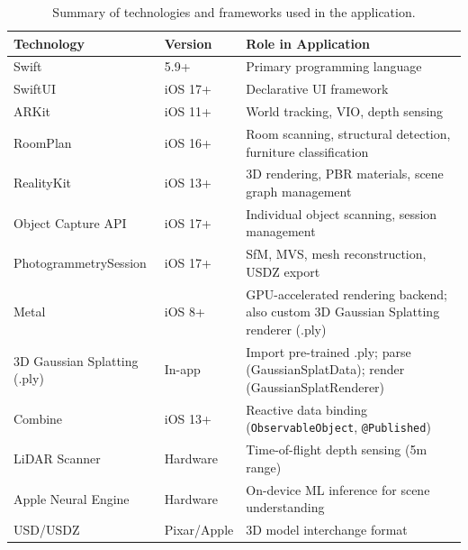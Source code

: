 \begin{table}[h]
\centering
\caption{Summary of technologies and frameworks used in the application.}
\label{tab:technologies}
\begin{tabular}{|l|l|p{7cm}|}
\hline
\textbf{Technology} & \textbf{Version} & \textbf{Role in Application} \\
\hline
Swift & 5.9+ & Primary programming language \\
SwiftUI & iOS 17+ & Declarative UI framework \\
ARKit & iOS 11+ & World tracking, VIO, depth sensing \\
RoomPlan & iOS 16+ & Room scanning, structural detection, furniture classification \\
RealityKit & iOS 13+ & 3D rendering, PBR materials, scene graph management \\
Object Capture API & iOS 17+ & Individual object scanning, session management \\
PhotogrammetrySession & iOS 17+ & SfM, MVS, mesh reconstruction, USDZ export \\
Metal & iOS 8+ & GPU-accelerated rendering backend; also custom 3D Gaussian Splatting renderer (.ply) \\
3D Gaussian Splatting (.ply) & In-app & Import pre-trained .ply; parse (GaussianSplatData); render (GaussianSplatRenderer) \\
Combine & iOS 13+ & Reactive data binding (\texttt{ObservableObject}, \texttt{@Published}) \\
LiDAR Scanner & Hardware & Time-of-flight depth sensing (5m range) \\
Apple Neural Engine & Hardware & On-device ML inference for scene understanding \\
USD/USDZ & Pixar/Apple & 3D model interchange format \\
\hline
\end{tabular}
\end{table}

